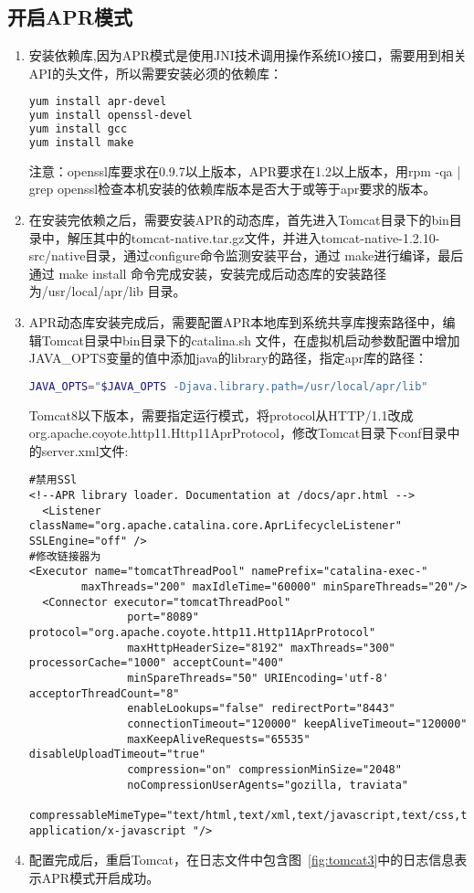 \subsection{开启APR模式}
\begin{enumerate}
\item 安装依赖库,因为APR模式是使用JNI技术调用操作系统IO接口，需要用到相关API的头文件，所以需要安装必须的依赖库：
\begin{lstlisting}[language=bash,numbers=none]
yum install apr-devel
yum install openssl-devel
yum install gcc
yum install make
\end{lstlisting}
注意：openssl库要求在0.9.7以上版本，APR要求在1.2以上版本，用rpm -qa | grep openssl检查本机安装的依赖库版本是否大于或等于apr要求的版本。

\item 在安装完依赖之后，需要安装APR的动态库，首先进入Tomcat目录下的bin目录中，解压其中的tomcat-native.tar.gz文件，并进入tomcat-native-1.2.10-src/native目录，通过configure命令监测安装平台，通过 make进行编译，最后通过 make install 命令完成安装，安装完成后动态库的安装路径为/usr/local/apr/lib 目录。
\item APR动态库安装完成后，需要配置APR本地库到系统共享库搜索路径中，编辑Tomcat目录中bin目录下的catalina.sh 文件，在虚拟机启动参数配置中增加JAVA\_OPTS变量的值中添加java的library的路径，指定apr库的路径：
\begin{lstlisting}[language=bash,numbers=none]
JAVA_OPTS="$JAVA_OPTS -Djava.library.path=/usr/local/apr/lib"
\end{lstlisting}
Tomcat8以下版本，需要指定运行模式，将protocol从HTTP/1.1改成org.apache.coyote.http11.Http11AprProtocol，修改Tomcat目录下conf目录中的server.xml文件:
\begin{lstlisting}[numbers=none]
#禁用SSl
<!--APR library loader. Documentation at /docs/apr.html -->
  <Listener className="org.apache.catalina.core.AprLifecycleListener" SSLEngine="off" />
#修改链接器为
<Executor name="tomcatThreadPool" namePrefix="catalina-exec-"
        maxThreads="200" maxIdleTime="60000" minSpareThreads="20"/>
  <Connector executor="tomcatThreadPool"
               port="8089" protocol="org.apache.coyote.http11.Http11AprProtocol"
               maxHttpHeaderSize="8192" maxThreads="300" processorCache="1000" acceptCount="400"
               minSpareThreads="50" URIEncoding='utf-8'  acceptorThreadCount="8"
               enableLookups="false" redirectPort="8443"
               connectionTimeout="120000" keepAliveTimeout="120000"
               maxKeepAliveRequests="65535" disableUploadTimeout="true"
               compression="on" compressionMinSize="2048"
               noCompressionUserAgents="gozilla, traviata"
               compressableMimeType="text/html,text/xml,text/javascript,text/css,text/plain,application/json,
application/x-javascript "/>
\end{lstlisting}
\item 配置完成后，重启Tomcat，在日志文件中包含图~\ref{fig:tomcat3}中的日志信息表示APR模式开启成功。
\end{enumerate}

